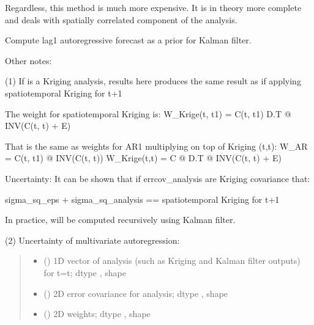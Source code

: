\documentclass[letterpaper,10pt,english]{sphinxmanual}
\begin{document}
\begin{fulllineitems}
\sphinxAtStartPar
Regardless, this method is much more expensive. It is in theory more
complete and deals with spatially correlated component of the analysis.

\sphinxAtStartPar
Compute lag\sphinxhyphen{}1 autoregressive forecast as a prior for Kalman filter.

\sphinxAtStartPar
Other notes:

\sphinxAtStartPar
(1) If  is a Kriging analysis, results here produces the same
result as if applying spatiotemporal Kriging for t+1

\sphinxAtStartPar
The weight for spatiotemporal Kriging is:
W\_Krige(t, t\sphinxhyphen{}1) = C(t, t\sphinxhyphen{}1) D.T @ INV(C(t, t) + E)

\sphinxAtStartPar
That is the same as weights for AR1 multiplying on top of Kriging (t,t):
W\_AR = C(t, t\sphinxhyphen{}1) @ INV(C(t, t))
W\_Krige(t,t) = C @ D.T @ INV(C(t, t) + E)

\sphinxAtStartPar
Uncertainty: It can be shown that if errcov\_analysis are Kriging covariance
that:

\sphinxAtStartPar
sigma\_sq\_eps + sigma\_sq\_analysis == spatiotemporal Kriging for t+1

\sphinxAtStartPar
In practice,  will be computed recursively using Kalman filter.

\sphinxAtStartPar
(2) Uncertainty of multivariate autoregression:
\begin{quote}\begin{description}
\begin{itemize}
\item {}
\sphinxAtStartPar
{} () \textendash{} 1D vector of analysis (such as Kriging and
Kalman filter outputs) for t=t;
dtype , shape 

\item {}
\sphinxAtStartPar
{} () \textendash{} 2D error covariance for analysis;
dtype , shape 

\item {}
\sphinxAtStartPar
{} () \textendash{} 2D weights;
dtype , shape 


\end{itemize}
\end{description}
\end{quote}
\end{fulllineitems}
\end{document}
